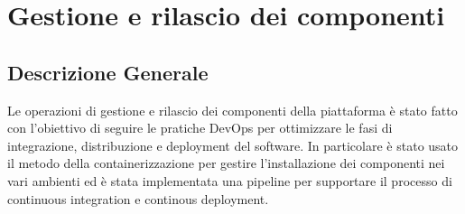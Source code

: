 \chapter{Gestione e rilascio dei componenti}
\section{Descrizione Generale}
Le operazioni di gestione e rilascio dei componenti della piattaforma è stato fatto con l'obiettivo
di seguire le pratiche DevOps per ottimizzare le fasi di integrazione, distribuzione e deployment
del software. In particolare è stato usato il metodo della containerizzazione per gestire l'installazione dei componenti
nei vari ambienti ed è stata implementata una pipeline per supportare il processo di continuous integration
e continous deployment.



